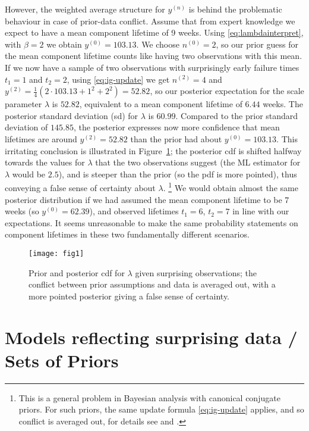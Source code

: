 \documentclass[Journal,SectionNumbers,SingleSpace,InsideFigs]{ascelike}
\newcommand{\uz}{^{(0)}} %
\newcommand{\un}{^{(n)}} %
\def\yz{y\uz}
\def\yn{y\un}
\newcommand{\yfun}[1]{y^{({#1})}}
\def\nz{n\uz}
\newcommand{\nfun}[1]{n^{({#1})}}
\begin{document}
However, the weighted average structure for $\yn$
is behind the problematic behaviour in case of prior-data conflict.
Assume that from expert knowledge we expect
to have a mean component lifetime of 9 weeks.
Using \eqref{eq:lambdainterpret}, with $\beta=2$ we obtain $\yz = 103.13$.
We choose $\nz = 2$, so our prior guess for the mean component lifetime
counts like having two observations with this mean.
If we now have a sample of two observations
with surprisingly early failure times $t_1 = 1$ and $t_2 = 2$,
using \eqref{eq:ig-update} we get $\nfun{2} = 4$
and $\yfun{2} = \frac{1}{4}(2 \cdot 103.13 + 1^2 + 2^2) = 52.82$,
so our posterior expectation for the scale parameter $\lambda$ is $52.82$,
equivalent to a mean component lifetime of $6.44$ weeks.
The posterior standard deviation (sd) for $\lambda$ is $60.99$.
Compared to the prior standard deviation of $145.85$,
the posterior expresses now more confidence that mean lifetimes are around $\yfun{2} = 52.82$
than the prior had about $\yz = 103.13$.
This irritating conclusion is illustrated in Figure~\ref{fig:weibull-pdc};
the posterior cdf is shifted halfway towards the values for $\lambda$
that the two observations suggest
(the ML estimator for $\lambda$ would be $2.5$),
and is steeper than the prior (so the pdf is more pointed),
thus conveying a false sense of certainty about $\lambda$.%
\footnote{This is a general problem in Bayesian analysis with canonical conjugate priors.
For such priors, the same update formula \eqref{eq:ig-update} applies,
and so conflict is averaged out, for details see  and .}
We would obtain almost the same %
posterior distribution
if we had assumed the mean component lifetime to be 7 weeks (so $\yz = 62.39$),
and observed lifetimes $t_1 = 6$, $t_2 = 7$ in line with our expectations.
It seems unreasonable to make the same probability statements on component lifetimes in these two fundamentally different scenarios.
%
\begin{figure}
\centering
\texttt{[image: fig1]}
\caption{Prior and posterior cdf for $\lambda$ given surprising observations;
the conflict between prior assumptions and data is averaged out,
with a more pointed posterior giving a false sense of certainty.}
\label{fig:weibull-pdc}
\end{figure}


\section{Models reflecting surprising data / Sets of Priors}
\label{sec:modforsurpr}
\end{document}
